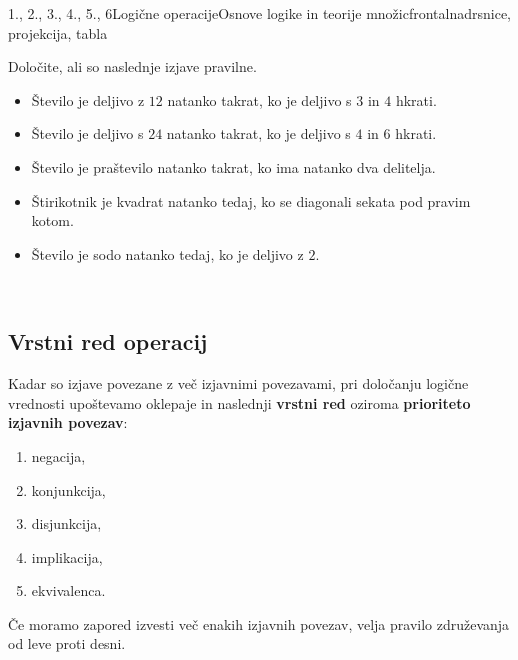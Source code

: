 \begin{priprava}{1., 2., 3., 4., 5., 6}{}{Logične operacije}{Osnove logike in teorije množic}{frontalna}{drsnice, projekcija, tabla}
   \begin{naloga}
      Določite, ali so naslednje izjave pravilne.
      \begin{itemize}
          \item Število je deljivo z $12$ natanko takrat, ko je deljivo s $3$ in $4$ hkrati.
          \item Število je deljivo s $24$ natanko takrat, ko je deljivo s $4$ in $6$ hkrati.
          \item Število je praštevilo natanko takrat, ko ima natanko dva delitelja.
          \item Štirikotnik je kvadrat natanko tedaj, ko se diagonali sekata pod pravim kotom.
          \item Število je sodo natanko tedaj, ko je deljivo z $2$.
      \end{itemize}
  \end{naloga}

~

   \subsection{Vrstni red operacij}
      Kadar so izjave povezane z več izjavnimi povezavami, pri določanju logične 
      vrednosti upoštevamo oklepaje in naslednji \textbf{vrstni red} oziroma
      \textbf{prioriteto izjavnih povezav}:
      \begin{enumerate}
          \item negacija,
          \item konjunkcija,
          \item disjunkcija,
          \item implikacija,
          \item ekvivalenca.
      \end{enumerate}
   
    
      Če moramo zapored izvesti več enakih izjavnih povezav, velja pravilo združevanja 
      od leve proti desni.
   

~


\end{priprava}
